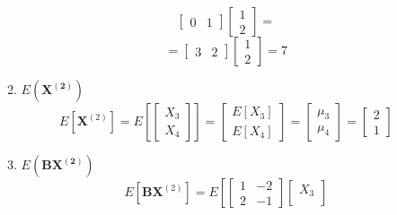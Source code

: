 \begin{enumerate}[font=\bfseries]
\begin{enumerate}
\[\begin{bmatrix}
                    0 & 1
                \end{bmatrix}
                \begin{bmatrix}
                    1 \\
                    2
                \end{bmatrix}
                =
            \]
            \[
                =
                \begin{bmatrix}
                    3 & 2
                \end{bmatrix}
                \begin{bmatrix}
                    1 \\
                    2
                \end{bmatrix}
                = 7
            \]
            \item $E\left(\mathbf{X^{(2)}}\right)$
            \[
                E\left[\mathbf{X}^{(2)}\right]
                = 
                E\left[
                    \begin{bmatrix}
                        X_3 \\
                        X_4
                    \end{bmatrix}
                \right]
                =
                \begin{bmatrix}
                    E[X_3] \\
                    E[X_4]
                \end{bmatrix}
                =
                \begin{bmatrix}
                    \mu_3 \\
                    \mu_4
                \end{bmatrix}
                =\begin{bmatrix}
                    2 \\
                    1
                \end{bmatrix}
            \]
            \item $E\left(\mathbf{B}\mathbf{X^{(2)}}\right)$
            \[
                E\left[\mathbf{B}\mathbf{X}^{(2)}\right]
                =
                E\left[
                    \begin{bmatrix}
                        1 & -2 \\
                        2 & -1
                    \end{bmatrix}
                    \begin{bmatrix}
                        X_3 \\

\end{bmatrix}\]
\end{enumerate}
\end{enumerate}
